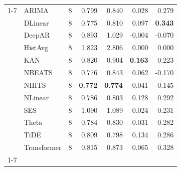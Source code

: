 \begin{tabular}{llrrrrr}
\cline{1-7}
\multirow[t]{12}{*}{Other} & ARIMA & 8 & 0.799 & 0.840 & 0.028 & 0.279 \\
 & DLinear & 8 & 0.775 & 0.810 & 0.097 & \textbf{0.343} \\
 & DeepAR & 8 & 0.893 & 1.029 & -0.004 & -0.070 \\
 & HistAvg & 8 & 1.823 & 2.806 & 0.000 & 0.000 \\
 & KAN & 8 & 0.820 & 0.904 & \textbf{0.163} & 0.223 \\
 & NBEATS & 8 & 0.776 & 0.843 & 0.062 & -0.170 \\
 & NHITS & 8 & \textbf{0.772} & \textbf{0.774} & 0.041 & 0.145 \\
 & NLinear & 8 & 0.786 & 0.803 & 0.128 & 0.292 \\
 & SES & 8 & 1.090 & 1.089 & 0.024 & 0.231 \\
 & Theta & 8 & 0.784 & 0.830 & 0.031 & 0.282 \\
 & TiDE & 8 & 0.809 & 0.798 & 0.134 & 0.286 \\
 & Transformer & 8 & 0.815 & 0.873 & 0.065 & 0.328 \\
\cline{1-7}
\bottomrule
\end{tabular}
